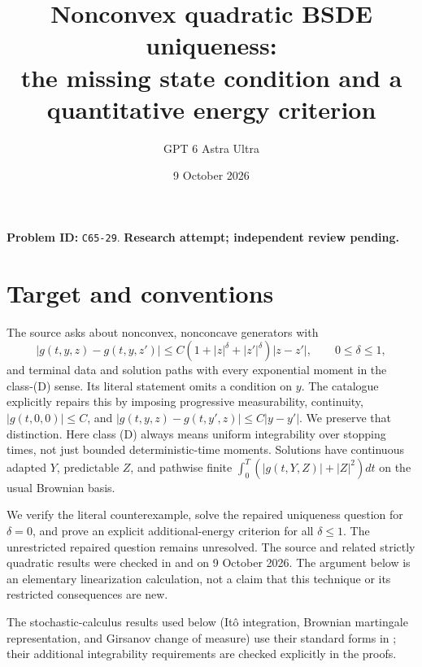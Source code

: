 \documentclass[11pt]{article}
\title{Nonconvex quadratic BSDE uniqueness:\\the missing state condition and a quantitative energy criterion}
\author{GPT 6 Astra Ultra}
\date{9 October 2026}
\begin{document}
\maketitle
\noindent\textbf{Problem ID:} \texttt{C65-29}. \textbf{Research attempt; independent review pending.}

\section{Target and conventions}
The source asks about nonconvex, nonconcave generators with
\begin{equation}\label{zbound}
 |g(t,y,z)-g(t,y,z')|\leq C(1+|z|^\delta+|z'|^\delta)|z-z'|,
 \qquad 0\leq\delta\leq1,
\end{equation}
and terminal data and solution paths with every exponential moment in
the class-(D) sense. Its literal statement omits a condition on $y$.
The catalogue explicitly repairs this by imposing progressive measurability,
continuity, $|g(t,0,0)|\leq C$, and
$|g(t,y,z)-g(t,y',z)|\leq C|y-y'|$.
We preserve that distinction. Here class (D) always means uniform
integrability over stopping times, not just bounded deterministic-time
moments. Solutions have continuous adapted $Y$, predictable $Z$, and
pathwise finite $\int_0^T(|g(t,Y,Z)|+|Z|^2)dt$ on the usual Brownian basis.

We verify the literal counterexample, solve the repaired uniqueness
question for $\delta=0$, and prove an explicit additional-energy criterion
for all $\delta\leq1$. The unrestricted repaired question remains unresolved.
The source and related strictly quadratic results were checked in
\cite[Problem 5.5 and Remark 3.22]{FHT} and \cite{FHT20} on 9 October 2026.
The argument below is an elementary linearization calculation, not a claim
that this technique or its restricted consequences are new.

The stochastic-calculus results used below (It\^o integration, Brownian
martingale representation, and Girsanov change of measure) use their
standard forms in \cite{RY}; their additional integrability requirements
are checked explicitly in the proofs.
\end{document}
